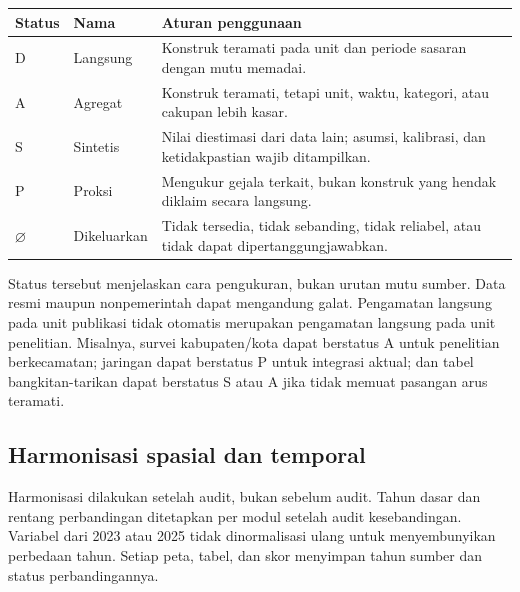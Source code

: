 \documentclass[11pt,a4paper,oneside,openany,indonesian]{report}
\begin{document}
{\def\LTcaptype{none} %
\begin{longtable}[]{@{}
  >{\raggedright\arraybackslash}p{}
  >{\raggedright\arraybackslash}p{}
  >{\raggedright\arraybackslash}p{}@{}}
\toprule\noalign{}
\begin{minipage}[b]{\linewidth}\raggedright
Status
\end{minipage} & \begin{minipage}[b]{\linewidth}\raggedright
Nama
\end{minipage} & \begin{minipage}[b]{\linewidth}\raggedright
Aturan penggunaan
\end{minipage} \\
\midrule\noalign{}
\endhead
\bottomrule\noalign{}
\endlastfoot
D & Langsung & Konstruk teramati pada unit dan periode sasaran dengan
mutu memadai. \\
A & Agregat & Konstruk teramati, tetapi unit, waktu, kategori, atau
cakupan lebih kasar. \\
S & Sintetis & Nilai diestimasi dari data lain; asumsi, kalibrasi, dan
ketidakpastian wajib ditampilkan. \\
P & Proksi & Mengukur gejala terkait, bukan konstruk yang hendak diklaim
secara langsung. \\
\(\varnothing\) & Dikeluarkan & Tidak tersedia, tidak sebanding, tidak
reliabel, atau tidak dapat dipertanggungjawabkan. \\
\end{longtable}
}

Status tersebut menjelaskan cara pengukuran, bukan urutan mutu sumber.
Data resmi maupun nonpemerintah dapat mengandung galat. Pengamatan
langsung pada unit publikasi tidak otomatis merupakan pengamatan
langsung pada unit penelitian. Misalnya, survei kabupaten/kota dapat
berstatus A untuk penelitian berkecamatan; jaringan dapat berstatus P
untuk integrasi aktual; dan tabel bangkitan-tarikan dapat berstatus S
atau A jika tidak memuat pasangan arus teramati.

\subsection{Harmonisasi spasial dan
temporal}\label{harmonisasi-spasial-dan-temporal}

Harmonisasi dilakukan setelah audit, bukan sebelum audit. Tahun dasar
dan rentang perbandingan ditetapkan per modul setelah audit
kesebandingan. Variabel dari 2023 atau 2025 tidak dinormalisasi ulang
untuk menyembunyikan perbedaan tahun. Setiap peta, tabel, dan skor
menyimpan tahun sumber dan status perbandingannya.
\end{document}
